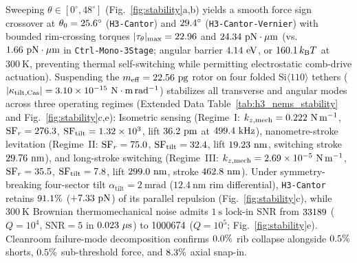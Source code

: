 \documentclass[pdflatex,sn-nature]{sn-jnl}
\begin{document}
Sweeping $\theta \in [0^\circ, 48^\circ]$ (Fig.~\ref{fig:stability}a,b) yields a smooth force sign crossover at $\theta_0 = 25.6{}^\circ$ (\texttt{H3-Cantor}) and $29.4{}^\circ$ (\texttt{H3-Cantor-Vernier}) with bounded rim-crossing torques $|\tau_\theta|_{\max} = 22.96{}$ and $24.34{}\ \mathrm{pN\cdot\mu m}$ (vs.\ $1.66{}\ \mathrm{pN\cdot\mu m}$ in \texttt{Ctrl-Mono-3Stage}; angular barrier $4.14{}\ \mathrm{eV}$, or $160.1{}\,k_{\mathrm{B}}T$ at $300\ \mathrm{K}$, preventing thermal self-switching while permitting electrostatic comb-drive actuation). Suspending the $m_{\mathrm{eff}} = 22.56{}\ \mathrm{pg}$ rotor on four folded $\mathrm{Si}\langle 110\rangle$ tethers ($|\kappa_{\mathrm{tilt,Cas}}| = 3.10\times 10^{-15}{}\ \mathrm{N\cdot m\,rad^{-1}}$) stabilizes all transverse and angular modes across three operating regimes (Extended Data Table~\ref{tab:h3_nems_stability} and Fig.~\ref{fig:stability}c,e): Isometric sensing (Regime~I: $k_{z,\mathrm{mech}} = 0.222{}\ \mathrm{N\,m^{-1}}$, $\mathrm{SF}_r = 276.3{}$, $\mathrm{SF}_{\mathrm{tilt}} = 1.32\times 10^{3}{}$, lift $36.2{}\ \mathrm{pm}$ at $499.4{}\ \mathrm{kHz}$), nanometre-stroke levitation (Regime~II: $\mathrm{SF}_r = 75.0{}$, $\mathrm{SF}_{\mathrm{tilt}} = 32.4{}$, lift $19.23{}\ \mathrm{nm}$, switching stroke $29.76{}\ \mathrm{nm}$), and long-stroke switching (Regime~III: $k_{z,\mathrm{mech}} = {2.69\times 10^{-5}{}}\ \mathrm{N\,m^{-1}}$, $\mathrm{SF}_r = 35.5{}$, $\mathrm{SF}_{\mathrm{tilt}} = 7.8{}$, lift $299.0{}\ \mathrm{nm}$, stroke $462.8{}\ \mathrm{nm}$). Under symmetry-breaking four-sector tilt $\alpha_{\mathrm{tilt}} = 2\ \mathrm{mrad}$ ($12.4\ \mathrm{nm}$ rim differential), \texttt{H3-Cantor} retains $91.1{}\%$ ($+7.33{}\ \mathrm{pN}$) of its parallel repulsion (Fig.~\ref{fig:stability}c), while $300\ \mathrm{K}$ Brownian thermomechanical noise admits $1\ \mathrm{s}$ lock-in SNR from $33189{}$ ($Q = 10^4$, $\mathrm{SNR}=5$ in $0.023{}\ \mu\mathrm{s}$) to $1000674{}$ ($Q = 10^5$; Fig.~\ref{fig:stability}e). Cleanroom failure-mode decomposition confirms $0.0{}\%$ rib collapse alongside $0.5{}\%$ shorts, $0.5{}\%$ sub-threshold force, and $8.3{}\%$ axial snap-in.
\end{document}

